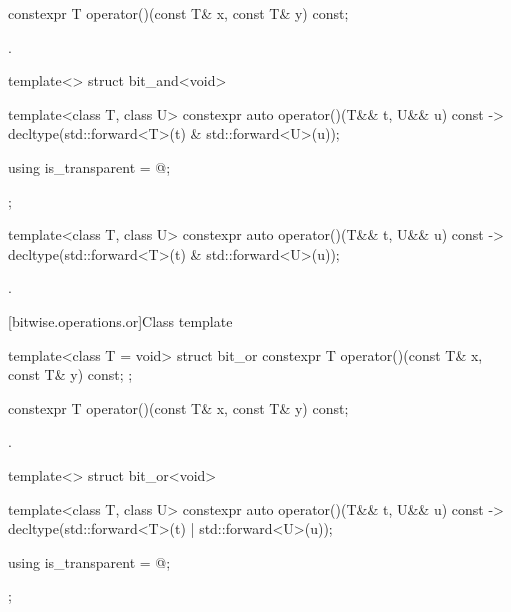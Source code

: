 %
\begin{itemdecl}
constexpr T operator()(const T& x, const T& y) const;
\end{itemdecl}

\begin{itemdescr}
\pnum
\returns
{}.
\end{itemdescr}

%
\begin{itemdecl}
template<> struct bit_and<void> {
  template<class T, class U> constexpr auto operator()(T&& t, U&& u) const
    -> decltype(std::forward<T>(t) & std::forward<U>(u));

  using is_transparent = @\unspec@;
};
\end{itemdecl}

%
\begin{itemdecl}
template<class T, class U> constexpr auto operator()(T&& t, U&& u) const
    -> decltype(std::forward<T>(t) & std::forward<U>(u));
\end{itemdecl}

\begin{itemdescr}
\pnum
\returns
{}.
\end{itemdescr}

[bitwise.operations.or]{Class template }

%
\begin{itemdecl}
template<class T = void> struct bit_or {
  constexpr T operator()(const T& x, const T& y) const;
};
\end{itemdecl}

%
\begin{itemdecl}
constexpr T operator()(const T& x, const T& y) const;
\end{itemdecl}

\begin{itemdescr}
\pnum
\returns
{}.
\end{itemdescr}

%
\begin{itemdecl}
template<> struct bit_or<void> {
  template<class T, class U> constexpr auto operator()(T&& t, U&& u) const
    -> decltype(std::forward<T>(t) | std::forward<U>(u));

  using is_transparent = @\unspec@;
};
\end{itemdecl}

